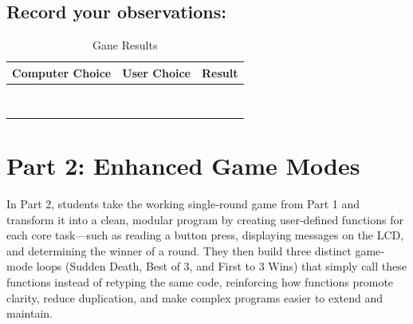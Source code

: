 \documentclass[a4paper,11pt]{article}
\begin{document}
\subsection*{Record your observations:}
\begin{table}[ht]
  \centering
  \renewcommand{\arraystretch}{1.5}
  \begin{tabular}{|p{4cm}|p{4cm}|p{4cm}|}
    \hline
    \textbf{Computer Choice} & \textbf{User Choice} & \textbf{Result} \\ \hline
     &  &  \\ \hline
     &  &  \\ \hline
     &  &  \\ \hline
     &  &  \\ \hline
     &  &  \\ \hline
     &  &  \\ \hline
     &  &  \\ \hline
     &  &  \\ \hline
  \end{tabular}
  \caption{Gane Results}
  \label{tab:empty-3x10}
\end{table}


\newpage
\section*{Part 2: Enhanced Game Modes }
In Part 2, students take the working single‐round game from Part 1 and transform it into a clean, 
modular program by creating user‐defined functions for each core task—such as reading a button press, 
displaying messages on the LCD, and determining the winner of a round. They then build three distinct 
game‐mode loops (Sudden Death, Best of 3, and First to 3 Wins) that simply call these functions instead of 
retyping the same code, reinforcing how functions promote clarity, reduce duplication, and make complex programs 
easier to extend and maintain.
\end{document}

